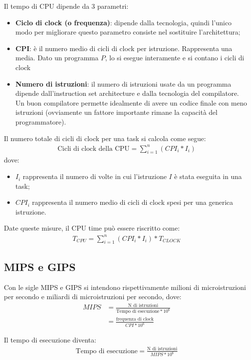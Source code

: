 Il tempo di CPU dipende da 3 parametri:
\begin{itemize}
    \item \textbf{Ciclo di clock (o frequenza)}: dipende dalla tecnologia, quindi l'unico modo per migliorare questo parametro consiste nel sostituire l'architettura;
    \item \textbf{CPI}: è il numero medio di cicli di clock per istruzione. Rappresenta una media. Dato un programma $P$, lo si esegue interamente e si contano i cicli di clock 
    \item \textbf{Numero di istruzioni}: il numero di istruzioni usate da un programma dipende dall'instruction set architecture e dalla tecnologia del compilatore. Un buon compilatore permette idealmente di avere un codice finale con meno istruzioni (ovviamente un fattore importante rimane la capacità del programmatore).
\end{itemize}

Il numero totale di cicli di clock per una task si calcola come segue:
\begin{align*}
    \text{Cicli di clock della CPU} = \sum^n_{i=1} (CPI_i * I_i)
\end{align*}
dove:
\begin{itemize}
    \item $I_i$ rappresenta il numero di volte in cui l'istruzione $I$ è stata eseguita in una task;
    \item $CPI_i$ rappresenta il numero medio di cicli di clock spesi per una generica istruzione.
\end{itemize}

Date queste misure, il CPU time può essere riscritto come:
\begin{align*}
    T_{CPU} = \sum^n_{i = 1} (CPI_i * I_i) * T_{CLOCK}
\end{align*}


\subsection{MIPS e GIPS}
Con le sigle MIPS e GIPS si intendono rispettivamente milioni di microistruzioni per secondo e miliardi di microistruzioni per secondo, dove:
\begin{align*}
    MIPS &= \frac{\text{N di istruzioni}}{\text{Tempo di esecuzione} * 10^6}\\
    &= \frac{\text{frequenza di clock}}{CPI * 10^6}
\end{align*}

Il tempo di esecuzione diventa:
\begin{align*}
    \text{Tempo di esecuzione} = \frac{\text{N di istruzioni}}{MIPS * 10^6}
\end{align*}

